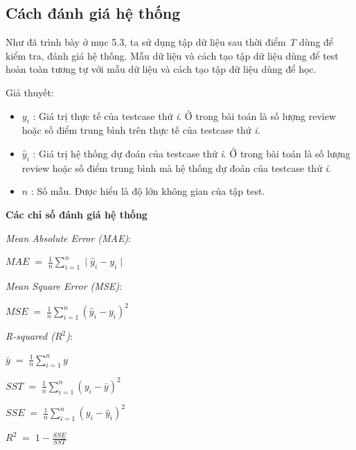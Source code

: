 \documentclass[12pt]{extarticle}
\begin{document}
		\subsection{Cách đánh giá hệ thống}
			\par Như đã trình bày ở mục 5.3, ta sử dụng tập dữ liệu sau thời điểm \textit{T} dùng để kiểm tra, đánh giá hệ thống. Mẫu dữ liệu và cách tạo tập dữ liệu dùng để test hoàn toàn tương tự với mẫu dữ liệu và cách tạo tập dữ liệu dùng để học.
			\par Giả thuyết:
			 \begin{itemize}
				\item $y_{i}$ : Giá trị thực tế của testcase thứ  \textit{i}. Ở trong bài toán là số lượng review hoặc số điểm trung bình trên thực tế của testcase thứ  \textit{i}.
				\item $\hat{y}_{i}$ : Giá trị hệ thống dự đoán của testcase thứ  \textit{i}. Ở trong bài toán là số lượng review hoặc số điểm trung bình mà hệ thống dự đoán của testcase thứ  \textit{i}.
				\item $n$ : Số mẫu. Được hiểu là độ lớn không gian của tập test.
			\end{itemize}
			\par \textbf{Các chỉ số đánh giá hệ thống}
			\par \textit{Mean Absolute Error (MAE)}: 
				\large
				\begin{center}
					$MAE\;=\;\frac{1}{n}\sum_{i=1}^n\mid \hat{y}_{i}-y_{i}\mid$
				\end{center}
				\normalsize
			\par \textit{Mean Square Error (MSE)}:
				\large
				\begin{center}
					$MSE\;=\;\frac{1}{n}\sum_{i=1}^n(\hat{y}_{i}-y_{i})^{2}$
				\end{center}
				\normalsize
			\par \textit{R-squared ($R^{2}$)}:
				\large
				\begin{center}
					\par $\bar{y}\;=\;\frac{1}{n}\sum_{i=1}^ny$
					\par $SST\;=\;\frac{1}{n}\sum_{i=1}^n(y_{i}-\bar{y})^{2}$
					\par $SSE\;=\;\frac{1}{n}\sum_{i=1}^n(y_{i}-\hat{y}_{i})^{2}$
					\par $R^{2}\;=\;1-\frac{SSE}{SST}$
				\end{center}
				\normalsize
\end{document}
